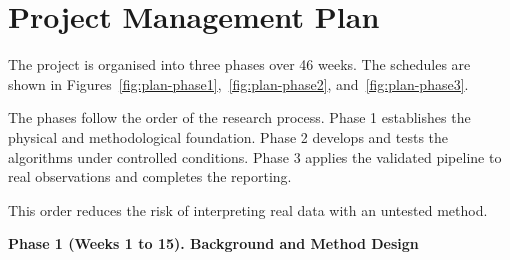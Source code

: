 




\section{Project Management Plan}

The project is organised into three phases over 46 weeks. The schedules are shown
in Figures~\ref{fig:plan-phase1},~\ref{fig:plan-phase2}, and~\ref{fig:plan-phase3}.

The phases follow the order of the research process. Phase 1 establishes the physical
and methodological foundation. Phase 2 develops and tests the algorithms under
controlled conditions. Phase 3 applies the validated pipeline to real observations
and completes the reporting.

This order reduces the risk of interpreting real data with an untested method.

\vspace{0.5cm}
\textbf{Phase 1 (Weeks 1 to 15). Background and Method Design}

